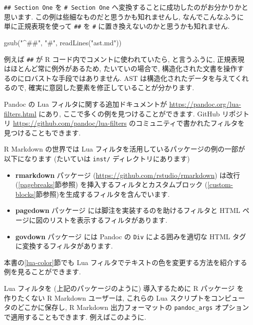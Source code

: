 \documentclass[
  11pt,
]{bxjsreport}
\newenvironment{Shaded}{\begin{snugshade}}{\end{snugshade}}
\newcommand{\FunctionTok}[1]{\textcolor[rgb]{0.00,0.00,0.00}{#1}}
\newcommand{\NormalTok}[1]{#1}
\newcommand{\StringTok}[1]{\textcolor[rgb]{0.31,0.60,0.02}{#1}}
\begin{document}
\texttt{\#\# Section One} を \texttt{\# Section One} へ変換することに成功したのがお分かりかと思います. この例は些細なものだと思うかも知れませんし, なんでこんなふうに単に正規表現を使って \texttt{\#\#} を \texttt{\#} に置き換えないのかと思うかも知れません.

\begin{Shaded}
\begin{Highlighting}[numbers=left,,]
\FunctionTok{gsub}\NormalTok{(}\StringTok{"\^{}\#\#"}\NormalTok{, }\StringTok{"\#"}\NormalTok{, }\FunctionTok{readLines}\NormalTok{(}\StringTok{"ast.md"}\NormalTok{))}
\end{Highlighting}
\end{Shaded}

例えば \texttt{\#\#} が R コード内でコメントに使われていたら, と言うふうに, 正規表現はほとんど常に例外があるため, たいていの場合で, 構造化された文書を操作するのにロバストな手段ではありません. AST は構造化されたデータを与えてくれるので, 確実に意図した要素を修正していることが分かります.

Pandoc の Lua フィルタに関する追加ドキュメントが \url{https://pandoc.org/lua-filters.html} にあり, ここで多くの例を見つけることができます. GitHub リポジトリ \url{https://github.com/pandoc/lua-filters} のコミュニティで書かれたフィルタを見つけることもできます.

R Markdown の世界では Lua フィルタを活用しているパッケージの例の一部が以下になります (たいていは \texttt{inst/} ディレクトリにあります)

\begin{itemize}
\item
  \textbf{rmarkdown} パッケージ (\url{https://github.com/rstudio/rmarkdown}) は改行 (\ref{pagebreaks}節参照) を挿入するフィルタとカスタムブロック (\ref{custom-blocks}節参照)を生成するフィルタを含んでいます.
\item
  \textbf{pagedown} パッケージ \autocite{R-pagedown} には脚注を実装するのを助けるフィルタと HTML ページに図のリストを表示するフィルタがあります.
\item
  \textbf{govdown} パッケージ \autocite{R-govdown} には Pandoc の \texttt{Div} による囲みを適切な HTML タグに変換するフィルタがあります.
\end{itemize}

本書の\ref{lua-color}節でも Lua フィルタでテキストの色を変更する方法を紹介する例を見ることができます.

Lua フィルタを (上記のパッケージのように) 導入するために R パッケージ を作りたくない R Markdown ユーザーは, これらの Lua スクリプトをコンピュータのどこかに保存し, R Markdown 出力フォーマットの \texttt{pandoc\_args} オプションで適用することもできます. 例えばこのように.
\end{document}
